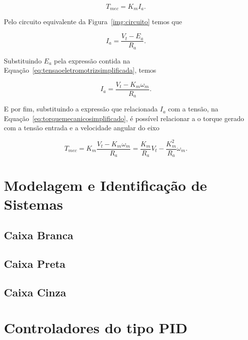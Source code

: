 		\begin{equation}
		    T_{mec} = K_m I_a.
		    \label{eq:torquemecanicosimplificado}
		\end{equation}
		
		Pelo circuito equivalente da Figura~\ref{img:circuito} temos que
		
		\begin{equation}
		    I_a = \frac{V_t - E_a}{R_a}.
		\end{equation}
		
		Substituindo $E_a$ pela expressão contida na Equação~\eqref{eq:tensaoeletromotrizsimplificada}, temos
		
		\begin{equation}
		    I_a = \frac{V_t - K_m \omega_m}{R_a}.
		\end{equation}
		
		E por fim, substituindo a expressão que relacionada $I_a$ com a tensão, na Equação~\eqref{eq:torquemecanicosimplificado}, é possível relacionar a o torque gerado com a tensão entrada e a velocidade angular do eixo
		
		\begin{equation}
		    T_{mec} = K_m \frac{V_t - K_m \omega_m}{R_a} = \frac{K_m}{R_a}V_t - \frac{K_m^2}{R_a}\omega_m.
		    \label{eq:torquemotor}
		\end{equation}
	
	\section{Modelagem e Identificação de Sistemas}
	
	    \subsection{Caixa Branca}
	    
	    \subsection{Caixa Preta}
	    
	    \subsection{Caixa Cinza}
	
	\section{Controladores do tipo PID}
	    
